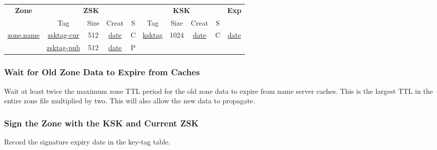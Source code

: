 \begin{center}
\begin{tabular}{|c|c|c|c|c|c|c|c|c|c|}
\hline
{\bf Zone} &
\multicolumn{4}{c|}{{\bf ZSK}} &
\multicolumn{4}{c|}{{\bf KSK}} &
{\bf Exp} \\
\cline{2-9}

 & Tag & Size & Creat & S & Tag & Size & Creat & S & \\
\hline

\underline{zone.name}	&
\underline{zsktag-cur}	&
512			&
\underline{date}	&
C			&
\underline{ksktag}	&
1024			&
\underline{date}	&
C			&
\underline{date}	\\

\cline{2-9}

			&
\underline{zsktag-pub}	&
512			&
\underline{date}	&
P			&
& & & & \\

\hline
\end{tabular}
\end{center}





\subsubsection{Wait for Old Zone Data to Expire from Caches}

Wait at least twice the maximum zone TTL period for the old zone data to
expire from name server caches.  This is the largest TTL in the entire zone
file multiplied by two.  This will also allow the new data to propagate.







\subsubsection{Sign the Zone with the KSK and Current ZSK}



Record the signature expiry date in the key-tag table.

